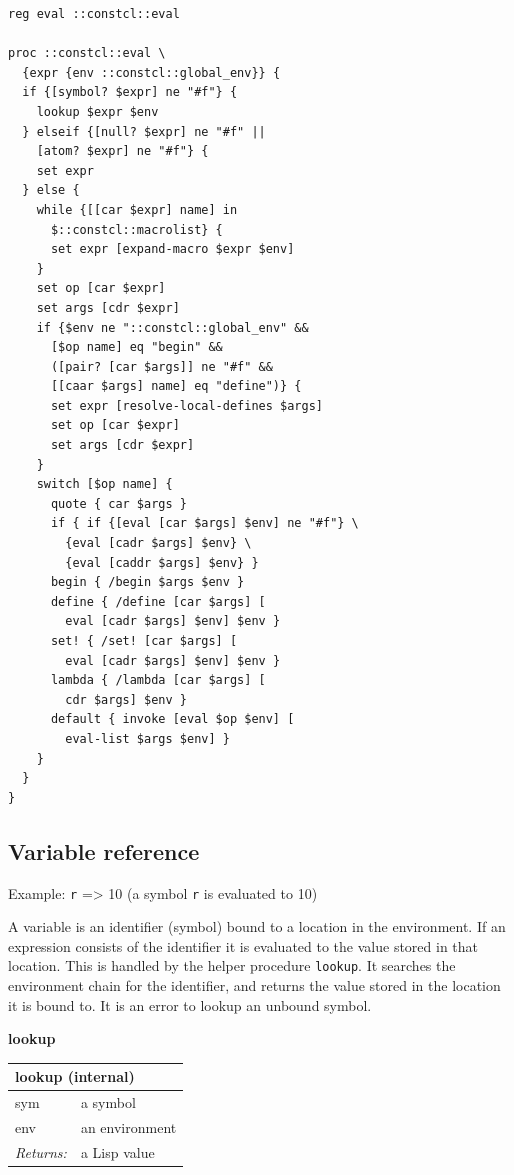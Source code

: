 \documentclass[twoside,9pt]{report}
\begin{document}
\noindent\makebox[\linewidth]{\rule{\linewidth}{0.4pt}}
\begin{lstlisting}
reg eval ::constcl::eval
 
proc ::constcl::eval \
  {expr {env ::constcl::global_env}} {
  if {[symbol? $expr] ne "#f"} {
    lookup $expr $env
  } elseif {[null? $expr] ne "#f" ||
    [atom? $expr] ne "#f"} {
    set expr
  } else {
    while {[[car $expr] name] in
      $::constcl::macrolist} {
      set expr [expand-macro $expr $env]
    }
    set op [car $expr]
    set args [cdr $expr]
    if {$env ne "::constcl::global_env" &&
      [$op name] eq "begin" &&
      ([pair? [car $args]] ne "#f" &&
      [[caar $args] name] eq "define")} {
      set expr [resolve-local-defines $args]
      set op [car $expr]
      set args [cdr $expr]
    }
    switch [$op name] {
      quote { car $args }
      if { if {[eval [car $args] $env] ne "#f"} \
        {eval [cadr $args] $env} \
        {eval [caddr $args] $env} }
      begin { /begin $args $env }
      define { /define [car $args] [
        eval [cadr $args] $env] $env }
      set! { /set! [car $args] [
        eval [cadr $args] $env] $env }
      lambda { /lambda [car $args] [
        cdr $args] $env }
      default { invoke [eval $op $env] [
        eval-list $args $env] }
    }
  }
}
\end{lstlisting}
\noindent\makebox[\linewidth]{\rule{\linewidth}{0.4pt}}
\subsection{Variable reference}
\label{variable-reference}

Example: \texttt{r} => 10 (a symbol \texttt{r} is evaluated to 10)


A variable is an identifier (symbol) bound to a location in the environment. If an expression consists of the identifier it is evaluated to the value stored in that location. This is handled by the helper procedure \texttt{lookup}. It searches the environment chain for the identifier, and returns the value stored in the location it is bound to. It is an error to lookup an unbound symbol.


\textbf{lookup}

\begin{tabular}{ |l l| }
\hline
\multicolumn{2}{|l|}{lookup (internal)} \\
\hline
sym & a symbol \\
env & an environment \\
\textit{Returns:} & a Lisp value \\
\hline
\end{tabular}
\end{document}
